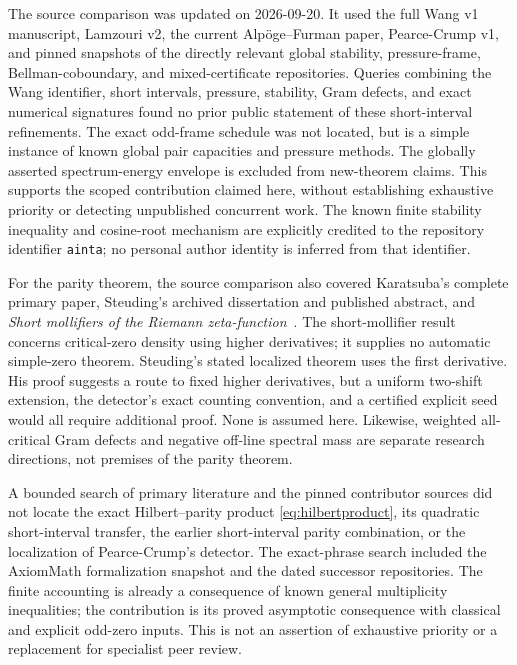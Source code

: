﻿\documentclass[11pt]{article}
\theoremstyle{remark}
\begin{document}
The source comparison was updated on 2026-09-20. It used the full
Wang v1 manuscript, Lamzouri v2, the current Alp\"oge--Furman paper,
Pearce-Crump v1,
and pinned snapshots of the directly relevant global stability,
pressure-frame, Bellman-coboundary, and mixed-certificate repositories.
Queries combining the Wang identifier, short intervals, pressure,
stability, Gram defects, and exact numerical signatures found no prior
public statement of these short-interval refinements. The exact odd-frame
schedule was not located, but is a simple instance of known global pair
capacities and pressure methods. The globally asserted spectrum-energy
envelope is excluded from new-theorem claims. This supports the
scoped contribution claimed here, without establishing exhaustive
priority or detecting unpublished concurrent work. The known finite
stability inequality and cosine-root mechanism are explicitly credited
to the repository identifier \texttt{ainta}; no personal author identity
is inferred from that identifier.

For the parity theorem, the source comparison also covered Karatsuba's
complete primary paper, Steuding's archived dissertation and published
abstract, and
\emph{Short mollifiers of the Riemann zeta-function}~\cite{CFKL}.
The short-mollifier result concerns critical-zero density
using higher derivatives; it supplies no automatic simple-zero theorem.
Steuding's stated localized theorem uses the first derivative. His proof
suggests a route to fixed higher derivatives, but a uniform two-shift
extension, the detector's exact counting convention, and a certified
explicit seed would all require additional proof. None is assumed here.
Likewise, weighted all-critical Gram defects and negative off-line spectral
mass are separate research directions, not premises of the parity theorem.

A bounded search of primary literature and the pinned contributor sources
did not locate the exact Hilbert--parity product \eqref{eq:hilbertproduct},
its quadratic short-interval transfer, the earlier short-interval parity
combination, or the localization of Pearce-Crump's detector. The exact-phrase
search included the AxiomMath formalization snapshot and the dated successor
repositories. The finite accounting is already a consequence
of known general multiplicity inequalities; the contribution is its proved
asymptotic consequence with classical and explicit odd-zero inputs. This is
not an assertion of exhaustive priority or a replacement for specialist peer
review.
\end{document}
